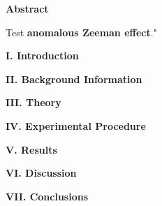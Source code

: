 \documentclass[fleqn]{article}
\begin{document}
  \textbf{Abstract}

  \vspace{10px}

  Test \textbf{anomalous Zeeman effect}." \textcite{One}
  
  \vspace{20px}




  \textbf{I. Introduction}

  \vspace{10px}

  
  \vspace{20px}





  \textbf{II. Background Information}

  \vspace{10px}

  
  \vspace{20px}



  \textbf{III. Theory}

  \vspace{10px}

  
  \vspace{20px}




  \textbf{IV. Experimental Procedure}

  \vspace{10px}

  
  \vspace{20px}





  \textbf{V. Results}

  \vspace{10px}

  
  \vspace{20px}




  \textbf{VI. Discussion}

  \vspace{10px}

  
  \vspace{20px}



  \textbf{VII. Conclusions}

  \vspace{10px}

  
  \vspace{20px}

  \printbibliography
\end{document}
